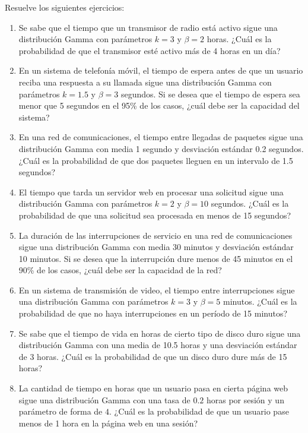 \begin{Ejer}
Resuelve los siguientes ejercicios:
\begin{enumerate}

\item Se sabe que el tiempo que un transmisor de radio está activo sigue una distribución Gamma con parámetros $k = 3$ y $\beta = 2$ horas. ¿Cuál es la probabilidad de que el transmisor esté activo más de 4 horas en un día?

\item En un sistema de telefonía móvil, el tiempo de espera antes de que un usuario reciba una respuesta a su llamada sigue una distribución Gamma con parámetros $k = 1.5$ y $\beta = 3$ segundos. Si se desea que el tiempo de espera sea menor que 5 segundos en el 95\% de los casos, ¿cuál debe ser la capacidad del sistema?

\item En una red de comunicaciones, el tiempo entre llegadas de paquetes sigue una distribución Gamma con media 1 segundo y desviación estándar 0.2 segundos. ¿Cuál es la probabilidad de que dos paquetes lleguen en un intervalo de 1.5 segundos?

\item El tiempo que tarda un servidor web en procesar una solicitud sigue una distribución Gamma con parámetros $k = 2$ y $\beta = 10$ segundos. ¿Cuál es la probabilidad de que una solicitud sea procesada en menos de 15 segundos?

\item La duración de las interrupciones de servicio en una red de comunicaciones sigue una distribución Gamma con media 30 minutos y desviación estándar 10 minutos. Si se desea que la interrupción dure menos de 45 minutos en el 90\% de los casos, ¿cuál debe ser la capacidad de la red?

\item En un sistema de transmisión de video, el tiempo entre interrupciones sigue una distribución Gamma con parámetros $k = 3$ y $\beta = 5$ minutos. ¿Cuál es la probabilidad de que no haya interrupciones en un período de 15 minutos?

\item Se sabe que el tiempo de vida en horas de cierto tipo de disco duro sigue una distribución Gamma con una media de 10.5 horas y una desviación estándar de 3 horas. ¿Cuál es la probabilidad de que un disco duro dure más de 15 horas?

\item La cantidad de tiempo en horas que un usuario pasa en cierta página web sigue una distribución Gamma con una tasa de $0.2$ horas por sesión y un parámetro de forma de $4$. ¿Cuál es la probabilidad de que un usuario pase menos de 1 hora en la página web en una sesión?


\end{enumerate}
\end{Ejer}

